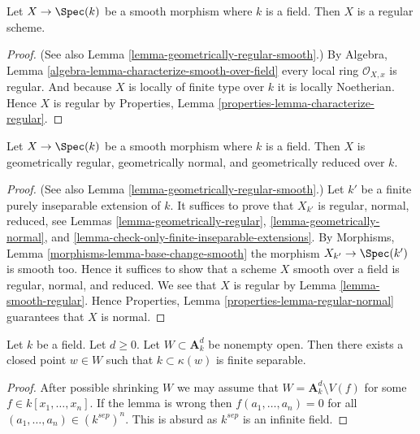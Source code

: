 \begin{lemma}
\label{lemma-smooth-regular}
Let $X \to \Spec(k)$ be a smooth morphism where $k$ is a field.
Then $X$ is a regular scheme.
\end{lemma}

\begin{proof}
(See also
Lemma \ref{lemma-geometrically-regular-smooth}.)
By
Algebra, Lemma \ref{algebra-lemma-characterize-smooth-over-field}
every local ring $\mathcal{O}_{X, x}$ is regular.
And because $X$ is locally of finite type over $k$ it is locally
Noetherian. Hence $X$ is regular by
Properties, Lemma \ref{properties-lemma-characterize-regular}.
\end{proof}

\begin{lemma}
\label{lemma-smooth-geometrically-normal}
Let $X \to \Spec(k)$ be a smooth morphism where $k$ is a field.
Then $X$ is geometrically regular, geometrically normal, and
geometrically reduced over $k$.
\end{lemma}

\begin{proof}
(See also
Lemma \ref{lemma-geometrically-regular-smooth}.)
Let $k'$ be a finite purely inseparable extension of $k$.
It suffices to prove that $X_{k'}$ is regular, normal, reduced, see
Lemmas \ref{lemma-geometrically-regular},
\ref{lemma-geometrically-normal}, and
\ref{lemma-check-only-finite-inseparable-extensions}.
By
Morphisms, Lemma \ref{morphisms-lemma-base-change-smooth}
the morphism $X_{k'} \to \Spec(k')$ is smooth too.
Hence it suffices to show that a scheme $X$ smooth over a field is regular,
normal, and reduced. We see that $X$ is regular by
Lemma \ref{lemma-smooth-regular}.
Hence
Properties, Lemma \ref{properties-lemma-regular-normal}
guarantees that $X$ is normal.
\end{proof}

\begin{lemma}
\label{lemma-affine-space-over-field}
Let $k$ be a field. Let $d \geq 0$. Let $W \subset \mathbf{A}^d_k$
be nonempty open. Then there exists a closed point $w \in W$ such that
$k \subset \kappa(w)$ is finite separable.
\end{lemma}

\begin{proof}
After possible shrinking $W$ we may assume that
$W = \mathbf{A}^d_k \setminus V(f)$ for some $f \in k[x_1, \ldots, x_n]$.
If the lemma is wrong then $f(a_1, \ldots, a_n) = 0$ for all
$(a_1, \ldots, a_n) \in (k^{sep})^n$. This is absurd as $k^{sep}$
is an infinite field.
\end{proof}

